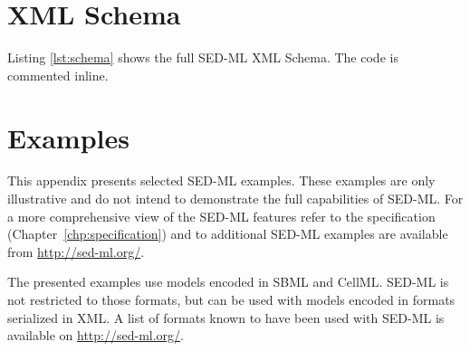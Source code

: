 \documentclass[pdftex,rgb,dvipsnames,svgnames,hyperref,table]{report}
\begin{document}
\chapter{XML Schema}
Listing \ref{lst:schema} shows the full SED-ML XML Schema. The code is commented inline.
\label{sec:xmlschema}

\chapter{Examples}
This appendix presents selected SED-ML examples. These examples are only illustrative and do not intend to demonstrate the full capabilities of SED-ML. For a more comprehensive view of the SED-ML features refer to the specification (Chapter~\ref{chp:specification}) and to additional SED-ML examples are available from \url{http://sed-ml.org/}.

The presented examples use models encoded in SBML and CellML. SED-ML is not restricted to those formats, but can be used with models encoded in formats serialized in XML. A list of formats known to have been used with SED-ML is available on \url{http://sed-ml.org/}.







% 

% 


\end{document}
